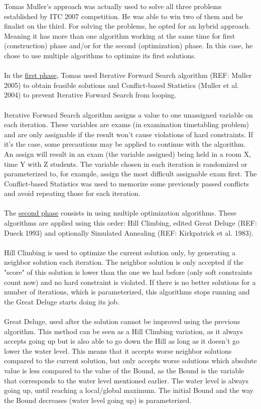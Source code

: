 Tomas Muller's approach was actually used to solve all three problems established by ITC 2007 competition. He was able to win two of them and be finalist on the third. For solving the problems, he opted for an hybrid approach. Meaning it has more than one algorithm working at the same time for first (construction) phase and/or for the second (optimization) phase. In this case, he chose to use multiple algorithms to optimize its first solutions.\\
\\
In the \underline{first phase}, Tomas used Iterative Forward Search algorithm (REF: Muller 2005) to obtain feasible solutions and Conflict-based Statistics (Muller et al. 2004) to prevent Iterative Forward Search from looping. \\
\\
Iterative Forward Search algorithm assigns a value to one unassigned variable on each iteration. These variables are exams (in examination timetabling problem) and are only assignable if the result won't cause violations of hard constraints. If it's the case, some precautions may be applied to continue with the algorithm. An assign will result in an exam (the variable assigned) being held in a room X, time Y with Z students. The variable chosen in each iteration is randomized or parameterized to, for example, assign the most difficult assignable exam first. The Conflict-based Statistics was used to memorize some previously passed conflicts and avoid repeating those for each iteration.\\
\\
The \underline{second phase} consists in using multiple optimization algorithms. These algorithms are applied using this order: Hill Climbing, edited Great Deluge (REF: Dueck 1993) and optionally Simulated Annealing (REF: Kirkpatrick et al. 1983).\\
\\
Hill Climbing is used to optimize the current solution only, by generating a neighbor solution each iteration. The neighbor solution is only accepted if the "score" of this solution is lower than the one we had before (only soft constraints count now) and no hard constraint is violated. If there is no better solutions for a number of iterations, which is parameterized, this algorithms stops running and the Great Deluge starts doing its job.\\
\\
Great Deluge, used after the solution cannot be improved using the previous algorithm. This method can be seen as a Hill Climbing variation, as it always accepts going up but is also able to go down the Hill as long as it doesn't go lower the water level. This means that it accepts worse neighbor solutions compared to the current solution, but only accepts worse solutions which absolute value is less compared to the value of the Bound, as the Bound is the variable that corresponds to the water level mentioned earlier. The water level is always going up, until reaching a local/global maximum. The initial Bound and the way the Bound decreases (water level going up) is parameterized.\\
